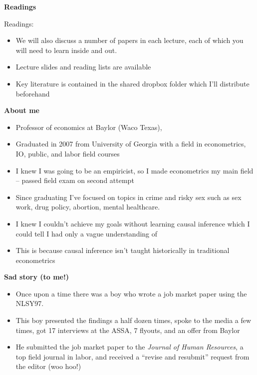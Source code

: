 \documentclass[notes=show]{beamer}
\begin{document}
\begin{frame}[plain]
\begin{center}
\textbf{Readings}
\end{center}

Readings: 
		\begin{itemize}
		\item We will also discuss a number of papers in each lecture, each of which you will need to learn inside and out.  
		\item Lecture slides and reading lists are available 
		\item Key literature is contained in the shared dropbox folder which I'll distribute beforehand
		\end{itemize}

\end{frame}



\begin{frame}
\begin{center}
\textbf{About me}
\end{center}

\begin{itemize}
	\item Professor of economics at Baylor (Waco Texas), 
	\item Graduated in 2007 from University of Georgia with a field in econometrics, IO, public, and labor field courses
	\item I knew I was going to be an empiricist, so I made econometrics my main field -- passed field exam on second attempt
	\item Since graduating I've focused on topics in crime and risky sex such as sex work, drug policy, abortion, mental healthcare. 
	\item I knew I couldn't achieve my goals without learning causal inference which I could tell I had only a vague understanding of
	\item This is because causal inference isn't taught historically in traditional econometrics 
\end{itemize}

\end{frame}





\begin{frame}[plain]
\begin{center}
\textbf{Sad story (to me!)}
\end{center}

\begin{itemize}
\item Once upon a time there was a boy who wrote a job market paper using the NLSY97. 
\item This boy presented the findings a half dozen times, spoke to the media a few times, got 17 interviews at the ASSA, 7 flyouts, and an offer from Baylor
\item He submitted the job market paper to the \emph{Journal of Human Resources}, a top field journal in labor, and received a ``revise and resubmit'' request from the editor (woo hoo!)
\end{itemize}

\end{frame}
\end{document}
